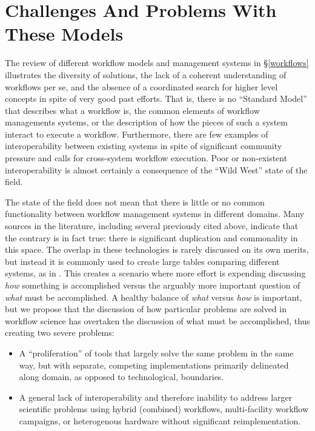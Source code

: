 \section{Challenges And Problems With These Models}\label{commonFunc}

The review of different workflow models and management systems in
\S\ref{workflows} illustrates the diversity of solutions, the lack of a coherent
understanding of workflows per se, and the absence of a coordinated search for
higher level concepts in spite of very good past efforts. That is, there is no
``Standard Model'' that describes what a workflow is, the common elements of
workflow managements systems, or the description of how the pieces of such a
system interact to execute a workflow. Furthermore, there are few examples of
interoperability between existing systems in spite of significant community
pressure and calls for cross-system workflow execution. Poor or non-existent
interoperability is almost certainly a consequence of the ``Wild West'' state of
the field.

The state of the field does not mean that there is little or no common
functionality between workflow management systems in different domains. Many
sources in the literature, including several previously cited above, indicate
that the contrary is in fact true: there is significant duplication and
commonality in this space. The overlap in these technologies is rarely discussed
on its own merits, but instead it is commonly used to create large tables
comparing different systems, as in
\cite{ferreira_da_silva_characterization_nodate}. This creates a scenario where
more effort is expending discussing \textit{how} something is accomplished
versus the arguably more important question of \textit{what} must be
accomplished. A healthy balance of \textit{what} versus \textit{how} is
important, but we propose that the discussion of how particular problems are
solved in workflow science has overtaken the discussion of what must be
accomplished, thus creating two severe problems: \begin{itemize} \item A
``proliferation'' of tools that largely solve the same problem in the same way,
but with separate, competing implementations primarily delineated along domain,
as opposed to technological, boundaries.  \item A general lack of
interoperability and therefore inability to address larger scientific problems
using hybrid (combined) workflows, multi-facility workflow campaigns, or
heterogenous hardware without significant reimplementation.  \end{itemize}

